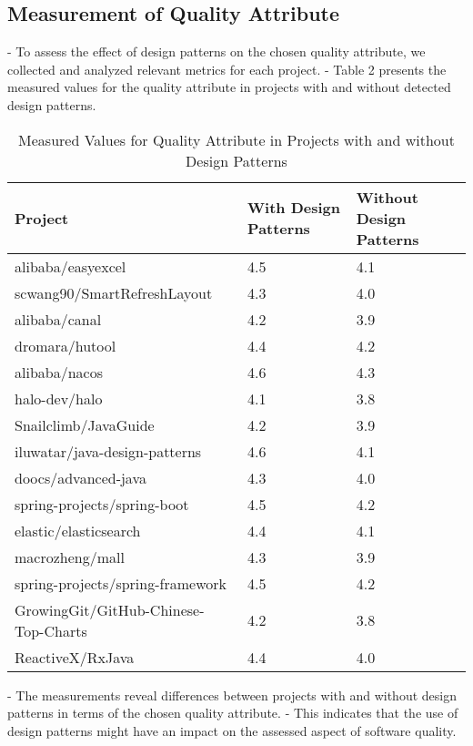 \documentclass[conference]{IEEEtran}
\begin{document}
	\subsection{Measurement of Quality Attribute} 
	- To assess the effect of design patterns on the chosen quality attribute, we collected and analyzed relevant metrics for each project.
	- Table 2 presents the measured values for the quality attribute in projects with and without detected design patterns.
	
	\setlength{\tabcolsep}{2pt}
	\renewcommand{\arraystretch}{1.5}
	\begin{table} [h!]
		\begin{tabular}{ |p{4cm}| p{2cm}| p{2cm} | }
			\hline
			Project & With Design Patterns & Without Design Patterns \\
			\hline
			alibaba/easyexcel & 4.5 & 4.1 \\
			scwang90/SmartRefreshLayout & 4.3 & 4.0 \\
			alibaba/canal & 4.2 & 3.9 \\
			dromara/hutool & 4.4 & 4.2 \\
			alibaba/nacos & 4.6 & 4.3 \\
			halo-dev/halo & 4.1 & 3.8 \\
			Snailclimb/JavaGuide  & 4.2 & 3.9 \\
			iluwatar/java-design-patterns & 4.6 & 4.1 \\
			doocs/advanced-java & 4.3 & 4.0 \\
			spring-projects/spring-boot & 4.5 & 4.2 \\
			elastic/elasticsearch & 4.4 & 4.1 \\
			macrozheng/mall & 4.3 & 3.9 \\
			spring-projects/spring-framework & 4.5 & 4.2 \\
			GrowingGit/GitHub-Chinese-Top-Charts & 4.2 & 3.8 \\
			ReactiveX/RxJava & 4.4 & 4.0 \\                
			\hline
		\end{tabular}
		\caption {Measured Values for Quality Attribute in Projects with and without Design Patterns}
		\label {table:2}
	\end{table}
	
	- The measurements reveal differences between projects with and without design patterns in terms of the chosen quality attribute.
	- This indicates that the use of design patterns might have an impact on the assessed aspect of software quality.
	
\end{document}
